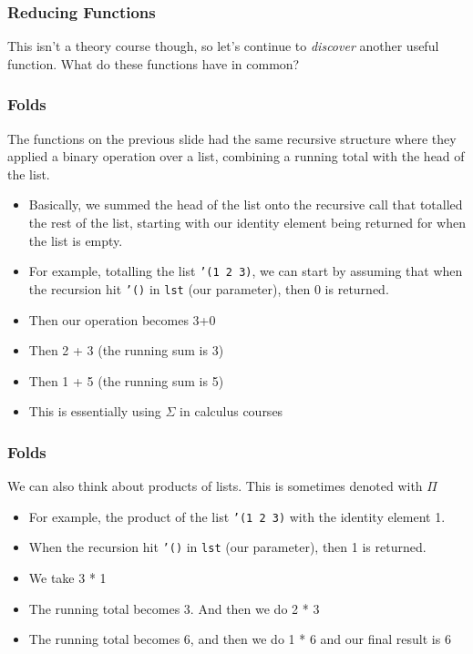 \documentclass{beamer}
\begin{document}

\begin{frame}
  \frametitle{Reducing Functions}
  This isn't a theory course though, so let's continue to \emph{discover}
  another useful function. What do these functions have in common?
  \bins
\end{frame}

\begin{frame}
  \frametitle{Folds}
  The functions on the previous slide had the same recursive structure
  where they applied a binary operation over a list, combining a running total
  with the head of the list.
  \begin{itemize}
  \item<2-> Basically, we summed the head of the list onto the recursive call
    that totalled the rest of the list, starting with our identity element being
    returned for when the list is empty.
  \item<3-> For example, totalling the list \texttt{'(1 2 3)}, we can
    start by assuming that when the recursion hit \texttt{'()} in
    \texttt{lst} (our parameter), then 0 is returned.
  \item<4-> Then our operation becomes 3+0
  \item<5-> Then 2 + 3 (the running sum is 3)
  \item<6-> Then 1 + 5 (the running sum is 5)
  \item<7-> This is essentially using $\Sigma$ in calculus courses
  \end{itemize}
\end{frame}

\begin{frame}
  \frametitle{Folds}
  We can also think about products of lists. This is sometimes denoted with
  $\Pi$
  \begin{itemize}
  \item<2-> For example, the product of the list
    \texttt{'(1 2 3)} with the identity element 1.
  \item<3-> When the recursion hit \texttt{'()} in
    \texttt{lst} (our parameter), then 1 is returned.
  \item<4-> We take 3 * 1
  \item<5-> The running total becomes 3. And then we do 2 * 3
  \item<6-> The running total becomes 6, and then we do 1 * 6
    and our final result is 6
  \end{itemize}
\end{frame}
\end{document}
